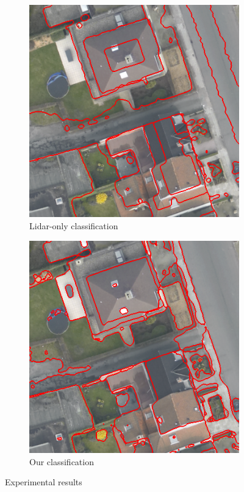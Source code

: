 \documentclass{article}[11pt]
\begin{document}
\begin{figure}[htb]
\begin{subfigure}{.33\textwidth}
  \centering
  \includegraphics[width=.8\linewidth]{./Images/DFC2015/lidarOnly.png}
  \caption{Lidar-only classification}
  \label{fig:lidarOnly}
\end{subfigure}
\begin{subfigure}{.33\textwidth}
  \centering
  \includegraphics[width=.8\linewidth]{./Images/DFC2015/withBorders.png}
  \caption{Our classification}
  \label{fig:classification}
\end{subfigure}
\caption{Experimental results}
\label{fig:experiment}
\end{figure}
\end{document}
